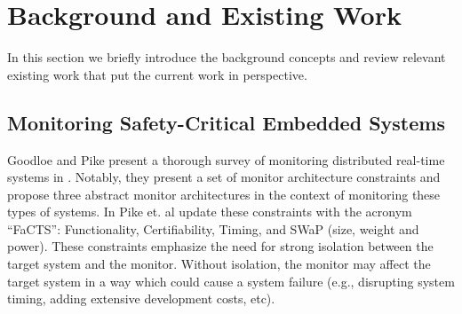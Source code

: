 
\section{Background and Existing Work}
In this section we briefly introduce the background concepts and review relevant existing work that put the current work in perspective.  
\subsection{Monitoring Safety-Critical Embedded Systems}
\label{sec:bg:sc_monitor}
Goodloe and Pike present a thorough survey of monitoring distributed real-time systems in \cite{Goodloe2010}. Notably, they present a set of monitor architecture constraints and propose three abstract monitor architectures in the context of monitoring these types of systems.
%
In \cite{Pike2011} Pike et. al update these constraints with the acronym ``FaCTS'': Functionality, Certifiability, Timing, and SWaP (size, weight and power). 
These constraints emphasize the need for strong isolation between the target system and the monitor. Without isolation, the monitor may affect the target system in a way which could cause a system failure (e.g., disrupting system timing, adding extensive development costs, etc).



